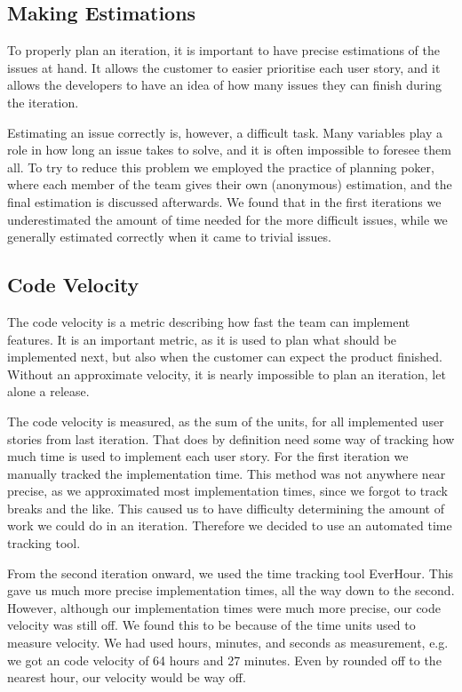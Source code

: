 \subsection{Making Estimations}
To properly plan an iteration, it is important to have precise estimations of the issues at hand.
It allows the customer to easier prioritise each user story, and it allows the developers to have an idea of how many issues they can finish during the iteration.

Estimating an issue correctly is, however, a difficult task.
Many variables play a role in how long an issue takes to solve, and it is often impossible to foresee them all.
To try to reduce this problem we employed the practice of planning poker, where each member of the team gives their own (anonymous) estimation, and the final estimation is discussed afterwards.
We found that in the first iterations we underestimated the amount of time needed for the more difficult issues, while we generally estimated correctly when it came to trivial issues.

\subsection{Code Velocity}
The code velocity is a metric describing how fast the team can implement features.
It is an important metric, as it is used to plan what should be implemented next, but also when the customer can expect the product finished.
Without an approximate velocity, it is nearly impossible to plan an iteration, let alone a release.

The code velocity is measured, as the sum of the units, for all implemented user stories from last iteration.
That does by definition need some way of tracking how much time is used to implement each user story.
For the first iteration we manually tracked the implementation time. This method was not anywhere near precise, as we approximated most implementation times, since we forgot to track breaks and the like. This caused us to have difficulty determining the amount of work we could do in an iteration. Therefore we decided to use an automated time tracking tool.

From the second iteration onward, we used the time tracking tool EverHour. 
This gave us much more precise implementation times, all the way down to the second.
However, although our implementation times were much more precise, our code velocity was still off.
We found this to be because of the time units used to measure velocity.
We had used hours, minutes, and seconds as measurement, e.g. we got an code velocity of 64 hours and 27 minutes.
Even by rounded off to the nearest hour, our velocity would be way off.

